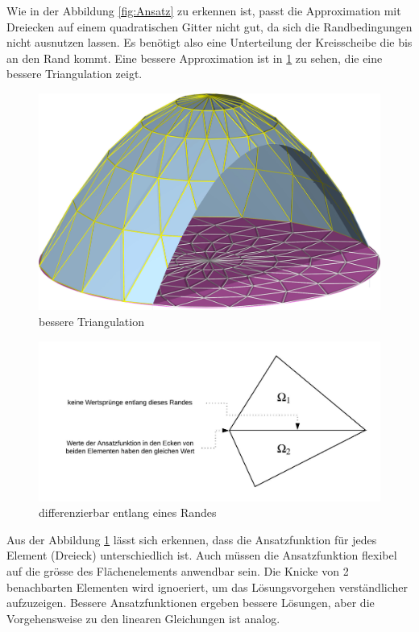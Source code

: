 Wie in der Abbildung \ref{fig:Ansatz} zu erkennen ist, passt die Approximation mit Dreiecken auf einem quadratischen Gitter nicht gut, da sich die Randbedingungen nicht ausnutzen lassen. Es benötigt also eine Unterteilung der Kreisscheibe die bis an den Rand kommt. Eine bessere Approximation ist in \ref{fig:besser Approx} zu sehen, die eine bessere Triangulation zeigt.
\begin{figure}[h!]
	\centering
	\includegraphics[scale=0.8]{papers/fem/Images/polar.jpg}
	\caption{bessere Triangulation}
	\label{fig:besser Approx}
\end{figure}
\begin{figure}[h]
	\centering
	\includegraphics[scale=0.8]{papers/fem/Images/Rand.jpeg}
	\caption{differenzierbar entlang eines Randes}
	\label{fig:Randbedingung}
\end{figure}
Aus der Abbildung \ref{fig:besser Approx} lässt sich erkennen, dass die Ansatzfunktion für jedes Element (Dreieck) unterschiedlich ist. Auch müssen die Ansatzfunktion flexibel auf die grösse des Flächenelements anwendbar sein. Die Knicke von 2 benachbarten Elementen wird ignoeriert, um das Lösungsvorgehen verständlicher aufzuzeigen. Bessere Ansatzfunktionen ergeben bessere Lösungen, aber die Vorgehensweise zu den linearen Gleichungen ist analog.
